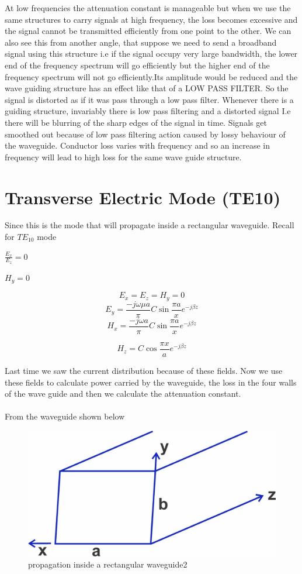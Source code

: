 At low frequencies  the attenuation  constant  is manageable but when we use the same structures to carry signals at high frequency, the  loss becomes excessive and the signal cannot be transmitted  efficiently from one point to the other. We can also see this from another angle, that suppose we need to send a broadband signal using this  structure i.e if the signal occupy very large bandwidth, the lower  end of the frequency  spectrum will go efficiently but the higher end of the frequency spectrum  will not go efficiently.Its amplitude  would be reduced and the wave guiding structure has an effect like that of a LOW PASS FILTER. So the signal is distorted  as if it was pass through a low pass filter. 
Whenever  there is a guiding structure, invariably there is low pass filtering  and a distorted signal I.e there will be blurring  of the sharp edges of the signal in time. Signals get smoothed out because of low pass filtering action caused by lossy behaviour of the waveguide. Conductor loss varies with frequency and so an increase  in frequency will lead to high loss for the same wave guide structure. 

\section{Transverse Electric Mode (TE10)}
Since this is the mode that will propagate inside a rectangular waveguide. Recall for
$TE_{10}$ mode
\begin{center}
$\frac{E_x}{E_z}=0$

$H_y=0$	
\end{center}
$$
E_{x} = E_{z} = H_{y} = 0
$$	
$$
E_{y} = \dfrac{-j\omega\mu a }{\pi} C\sin \dfrac{\pi a}{x} e ^{-j\beta z}
$$
$$
H_{x} = \dfrac{-j\omega a}{\pi} C \sin\dfrac{\pi a}{x}
e^{-j\beta z} 
$$

$$
H_{z} = C\cos \dfrac{\pi x}{a} e^{-j\beta z}
$$


Last time we saw the current distribution because of these fields. Now we use  these fields to calculate power carried by the waveguide, the loss in the four walls of the wave guide and then we calculate the attenuation constant.\\\\ 
From the waveguide shown below

\begin{figure}[H]
\centering
\includegraphics[width=1\linewidth]{./graphics/lecture-image-21.jpg}
\caption{propagation inside a rectangular waveguide2}
\end{figure}


